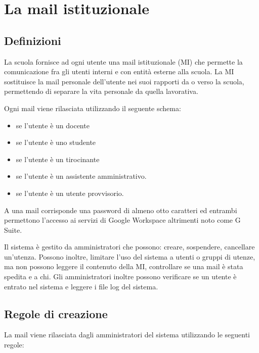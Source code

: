 \chapter{La mail istituzionale}
\section{Definizioni}
La scuola fornisce ad ogni utente una mail istituzionale (MI) che permette 
la comunicazione fra gli utenti interni e con entità esterne alla scuola. La MI sostituisce la mail personale dell'utente nei suoi rapporti
da o verso la scuola, permettendo di separare la vita  personale da quella lavorativa.

Ogni mail viene rilasciata utilizzando il seguente schema:
\begin{itemize}
	\item {} se l'utente è un docente
	\item {} se l'utente è uno studente
	\item {} se l'utente è un 
	tirocinante
	\item {} se l'utente è un 
	assistente 
	amministrativo.
	\item {} se l'utente è un 
	utente provvisorio.
\end{itemize}

A una mail corrisponde una password di almeno otto caratteri ed entrambi permettono
l'accesso ai servizi di  \textenglish{Google Workspace} altrimenti noto come \textenglish{G Suite}.

Il sistema è gestito da amministratori che possono: creare, sospendere, cancellare un'utenza. Possono inoltre, limitare l'uso del sistema a utenti o gruppi di utenze, ma non possono leggere il contenuto della MI, controllare se una mail è stata spedita e a chi. Gli amministratori inoltre possono verificare se un utente è entrato nel sistema e leggere i file log del sistema.

\section{Regole di creazione} 
La mail viene rilasciata dagli amministratori del sistema utilizzando le seguenti 
regole:

